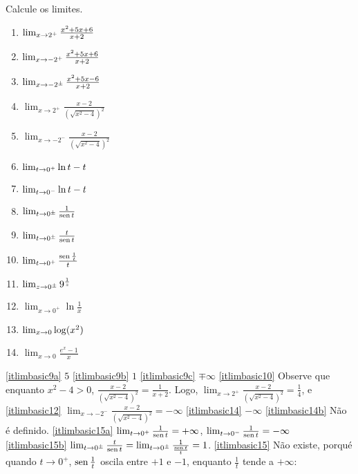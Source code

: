 \begin{exo}
Calcule os limites.
\begin{multicols}{3}
\begin{enumerate}
\item\label{itlimbasic9a} $\lim_{{x}\to {2^+}}\frac{x^2+5x+6}{x+2}$
\item\label{itlimbasic9b} $\lim_{{x}\to {-2^+}}\frac{x^2+5x+6}{x+2}$
\item\label{itlimbasic9c} $\lim_{{x}\to {-2^\pm}}\frac{x^2+5x-6}{x+2}$
\item\label{itlimbasic10} $\lim_{x\to 2^+}\frac{x-2}{(\sqrt{x^2-4})^2}$
\item\label{itlimbasic12} $\lim_{x\to -2^-}\frac{x-2}{(\sqrt{x^2-4})^2}$
\item\label{itlimbasic14} $\lim_{{t}\to {0^+}}\ln t-t$
\item\label{itlimbasic14b} $\lim_{{t}\to {0^-}}\ln t-t$
\item\label{itlimbasic15a} $\lim_{t\to 0^\pm}\frac{1}{\operatorname{sen} t}$
\item\label{itlimbasic15b} $\lim_{t\to 0^\pm}\frac{t}{\operatorname{sen} t}$
\item\label{itlimbasic15} $\lim_{t\to 0^+}\frac{\operatorname{sen} \frac1t}{t}$
\item\label{itlimbasic16} $\lim_{{z}\to {0^\pm}}9^{\frac{1}{z}}$
\item\label{itlimbasic18b} $\lim_{x\to 0^+}\ln \frac{1}{x}$
\item\label{itlimbasic19b} $\lim_{{x}\to {0}}\log(x^2)$
\item\label{itlimbasic13} $\lim_{x\to 0}\frac{e^x-1}{x}$
\end{enumerate}
\end{multicols}
\vspace{0.01cm}
\begin{sol}
\eqref{itlimbasic9a} $5$
\eqref{itlimbasic9b} $1$
\eqref{itlimbasic9c} $\mp \infty$
\eqref{itlimbasic10} Observe que enquanto $x^2-4>0$, $\frac{x-2}{(
\sqrt{x^2-4})^2}=\frac{1}{x+2}$. Logo, $\lim_{x\to
2^+}\frac{x-2}{(\sqrt{x^2-4})^2}=\frac14$, e
\eqref{itlimbasic12} $\lim_{x\to -2^-}\frac{x-2}{(\sqrt{x^2-4})^2}=
-\infty$
\eqref{itlimbasic14} $-\infty$
\eqref{itlimbasic14b} Não é definido.
\eqref{itlimbasic15a}   $\lim_{t\to 0^+}\frac{1}{\operatorname{sen} t}=+\infty$, 
$\lim_{t\to 0^-}\frac{1}{\operatorname{sen} t}=-\infty$
\eqref{itlimbasic15b}   $\lim_{t\to 0^\pm}\frac{t}{\operatorname{sen} t}=\lim_{t\to 
0^\pm}\frac{1}{\frac{\operatorname{sen} t}{t}}=1$.
\eqref{itlimbasic15} Não existe, porqué quando $t\to 0^+$, $\operatorname{sen}
\frac1t$ 
oscila entre $+1$ e $-1$, enquanto $\frac1t$ tende a $+\infty$:
\begin{center}

\end{center}
\end{sol}
\end{exo}
